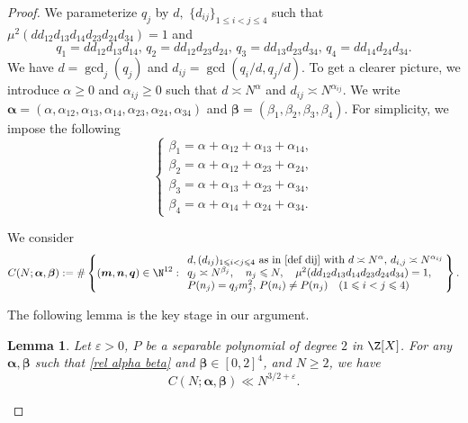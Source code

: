 \documentclass[reqno, 12pt]{amsart}
\theoremstyle{plain}
\newtheorem{lemma}[theorem]{Lemma}
\theoremstyle{definition}
\theoremstyle{remark}
\renewcommand{\leq}{\leqslant}
\renewcommand{\geq}{\geqslant}
\newcommand{\bfbeta}{\boldsymbol{\beta}}
\newcommand{\bfalpha}{\boldsymbol{\alpha}}
\newcommand{\bfm}{\boldsymbol{m}}
\newcommand{\bfn}{\boldsymbol{n}}
\newcommand{\bfq}{\boldsymbol{q}}
\begin{document}
\begin{proof}
We parameterize $q_j$ by $d,$ $\{d_{ij}\}_{1\leq i<j\leq 4}$ such that $\mu^2(dd_{12}d_{13}d_{14}d_{23}d_{24}d_{34})=1$ and 
\begin{equation}
    \label{def dij}
 q_1=dd_{12}d_{13}d_{14} ,\,
    q_2=dd_{12}d_{23}d_{24} ,\,
    q_3=dd_{13}d_{23}d_{34} ,\,
    q_4=dd_{14}d_{24}d_{34} . \end{equation} 
    We have $d=\gcd_j (q_j)$ and $d_{ij}=\gcd (q_i/d,q_j/d)$. 
To get a clearer picture, we introduce $\alpha\geq 0$ and $\alpha_{ij}\geq 0$ such that $d\asymp N^\alpha$ and $d_{ij}\asymp N^{\alpha_{ij}}$. We write $\bfalpha=(\alpha, \alpha_{12},  \alpha_{13},  \alpha_{14},  \alpha_{23},  \alpha_{24},  \alpha_{34})$ and
$\bfbeta=(\beta_1,\beta_2,\beta_3,\beta_4)$.
For simplicity, we impose the following
\begin{equation}
    \label{rel alpha beta}
\begin{cases}
    \beta_1=\alpha +\alpha_{12}+\alpha_{13}+\alpha_{14} ,\\ 
    \beta_2=\alpha +\alpha_{12}+\alpha_{23}+\alpha_{24} ,\\
    \beta_3=\alpha +\alpha_{13}+\alpha_{23}+\alpha_{34} ,\\
    \beta_4=\alpha +\alpha_{14}+\alpha_{24}+\alpha_{34} .\end{cases}\end{equation}

We consider
    $$%
    C(N;\bfalpha,\bfbeta):=\#\left\{(\bfm,\bfn,\bfq)\in \N^{12}:\begin{array}{l} d,(d_{ij})_{1\leq i<j\leq 4} \text{ as in } \eqref{def dij} \text{ with } d\asymp N^\alpha,\, d_{i,j}\asymp N^{\alpha_{ij}}\cr q_j\asymp N^{\beta_j},\quad n_j\leq N,\quad \mu^2(dd_{12}d_{13}d_{14}d_{23}d_{24}d_{34})=1,\cr P(n_j)=q_jm_j^2,\, P(n_i)\neq P(n_j)\quad (1\leq i<j\leq 4) \end{array}\!\!\right\}.$$%

    The following lemma is the key stage in our argument.
\begin{lemma}
    \label{lemma maj CBalphabeta} Let $\varepsilon>0$, $P$ be a separable polynomial of degree $2$ in $\Z[X]$.
    For any $\bfalpha,\bfbeta$ such that \eqref{rel alpha beta} and $\bfbeta\in [0,2]^4$, and $N\geq 2$, we have 
\begin{equation}
    \label{bound C}
C(N;\bfalpha,\bfbeta)\ll N^{3/2+\varepsilon}.\end{equation}
\end{lemma}


\end{proof}
\end{document}
